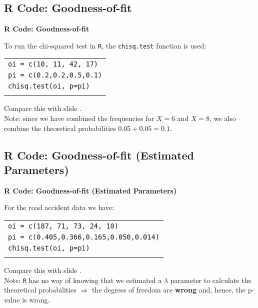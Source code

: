 \documentclass[compress]{beamer}        %
\makeatletter
\newcommand{\tcb}{\textcolor{beamer@blendedblue}}
\makeatother
\begin{document}
\subsection{R Code: Goodness-of-fit}
\begin{frame}{\bf \tcb{R Code: Goodness-of-fit}}

To run the chi-squared test in \texttt{R}, the \texttt{chisq.test} function is used:\\[0.5cm]
\begin{tabular}{|l|}
\hline
\texttt{oi = c(10, 11, 42, 17)}\\[0.2cm]
\texttt{pi = c(0.2,0.2,0.5,0.1)}\\[0.2cm]
\texttt{chisq.test(oi, p=pi)}\\
\hline
\multicolumn{1}{c}{}\\[0.2cm]
\end{tabular}

Compare this with slide \pageref{rannum}.\\[0.5cm]

Note: since we have combined the frequencies for $X=6$ and $X=8$, we also combine the theoretical probabilities $0.05 + 0.05 = 0.1$.

\end{frame}



\subsection{R Code: Goodness-of-fit (Estimated Parameters)}
\begin{frame}{\bf \tcb{R Code: Goodness-of-fit (Estimated Parameters)}}

For the road accident data we have:\\[0.5cm]
\begin{tabular}{|l|}
\hline
\texttt{oi = c(187, 71, 73, 24, 10)}\\[0.2cm]
\texttt{pi = c(0.405,0.366,0.165,0.050,0.014)}\\[0.2cm]
\texttt{chisq.test(oi, p=pi)}\\
\hline
\multicolumn{1}{c}{}\\[0.2cm]
\end{tabular}

Compare this with slide \pageref{road}.\\[0.5cm]

Note: \texttt{R} has no way of knowing that we estimated a $\lambda$ parameter to calculate the theoretical probabilities $\Rightarrow$ the degrees of freedom are {\bf wrong} and, hence, the p-value is wrong.


\end{frame}
\end{document}
